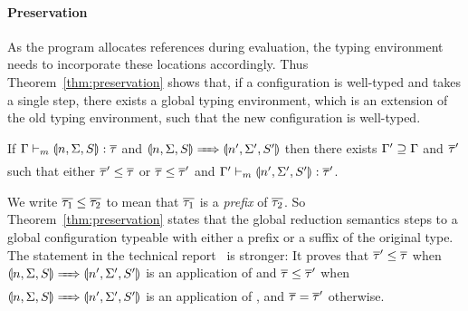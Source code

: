 \paragraph{Preservation}
As the program allocates references during evaluation, the typing environment needs to incorporate these locations accordingly. Thus Theorem~\ref{thm:preservation} shows that, if a configuration is well-typed and takes a single step, there exists a global typing environment, which is an extension of the old typing environment, such that the new configuration is well-typed.

\begin{theorem}[Preservation]\label{thm:preservation}
If $\hastype[m]{\tenv}{\gconfig{n}{\env}{S}}{\overline{\type}}$ and $\gconfig{n}{\env}{S} \gstepsto \gconfig{n'}{\env'}{S'}$ then there exists $\Gamma' \supseteq \Gamma$ and $\overline{\tau}'$ such that either $\overline{\tau}' \leq \overline{\tau}$ or $\overline{\tau} \leq \overline{\tau}'$ and $\hastype[m]{\tenv'}{\gconfig{n'}{\env'}{S'}}{\overline{\type}'}$.
\end{theorem}

We write $\overline{\tau_1} \leq \overline{\tau_2}$ to mean that $\overline{\tau_1}$ is a \emph{prefix} of $\overline{\tau_2}$. So Theorem~\ref{thm:preservation} states that the global reduction semantics steps to a global configuration typeable with either a prefix or a suffix of the original type. The statement in the technical report~\cite{techreport} is stronger: It proves that $\overline{\tau}' \leq \overline{\tau}$ when $\gconfig{n}{\env}{S} \gstepsto \gconfig{n'}{\env'}{S'}$ is an application of  and $\overline{\tau} \leq \overline{\tau}'$ when $\gconfig{n}{\env}{S} \gstepsto \gconfig{n'}{\env'}{S'}$ is an application of , and $\overline{\tau} = \overline{\tau}'$ otherwise.

